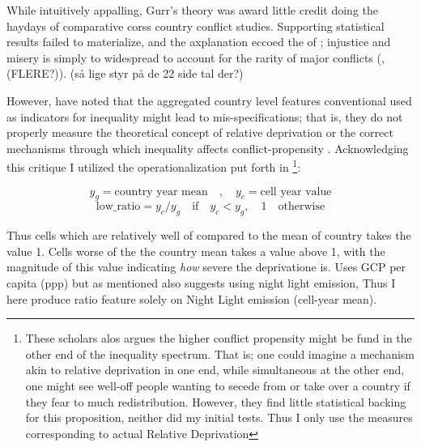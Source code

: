 \documentclass[a4paper]{article}
\begin{document}
While intuitively appalling, Gurr's theory was award little credit doing the haydays of comparative corss country conflict studies. Supporting statistical results failed to materialize, and the axplanation eccoed the of \cite[11]{Skocpol_1979}; injustice and misery is simply to widespread to account for the rarity of major conflicts (\citealp[p. 22]{Collier_Hoeffler_1998},  \citealp[p. 22]{Collier_Hoeffler_2004} \citealp[p. 44]{Fearon_Laitin_2003}(FLERE?)). (så lige styr på de 22 side tal der?)


However, \cite{Cederman_Gleditsch_2009,Cederman_Gleditsch_Buhaug_2013} have noted that the aggregated country level features conventional used as indicators for inequality might lead to mis-specifications; that is, they do not properly measure the theoretical concept of relative deprivation or the correct mechanisms through which inequality affects conflict-propensity \citep[XX]{Cederman_Gleditsch_Buhaug_2013}. Acknowledging this critique I utilized the operationalization put forth in \cite[p. 104-105]{Cederman_Gleditsch_Buhaug_2013}\footnote{These scholars alos argues the higher conflict propensity might be fund in the other end of the inequality spectrum. That is; one could imagine a mechanism akin to relative deprivation in one end, while simultaneous at the other end, one might see well-off people wanting to secede from or take over a country if they fear to much redistribution. However, they find little statistical backing for this proposition, neither did my initial tests. Thus I only use the measures corresponding to actual Relative Deprivation}:\par

$$y_g = \textrm{country year mean}\quad ,\quad  y_c = \textrm{cell year value}$$
$$\textrm{low\_ratio} = y_c/y_g  \quad \textrm{if} \quad y_c < y_g, \quad 1 \quad \textrm{otherwise}$$

Thus cells which are relatively well of compared to the mean of country takes the value 1. Cells worse of the the country mean takes a value above 1, with the magnitude of this value indicating \emph{how} severe the deprivatione is. \cite{Cederman_Gleditsch_Buhaug_2013} Uses GCP per capita (ppp) but as mentioned also suggests using night light emission, Thus I here produce ratio feature solely on Night Light emission (cell-year mean).\par
\end{document}
